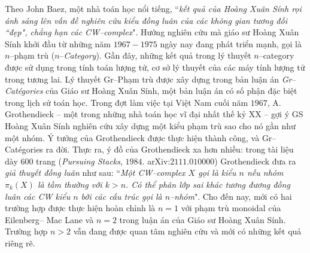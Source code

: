 \begin{multicols}{2}
	\vskip 0.1cm
	Theo John Baez, một nhà toán học nổi tiếng, ``\textit{kết quả của Hoàng Xuân Sính rọi ánh sáng lên vấn đề nghiên cứu kiểu đồng luân của các không gian tương đối ``đẹp", chẳng hạn các CW--complex}".   
	\vskip 0.1cm
	Hướng nghiên cứu mà giáo sư Hoàng Xuân Sính khởi đầu từ những năm $1967-1975$ ngày nay đang phát triển mạnh, gọi là $n$--phạm trù ($n$--\textit{Category}). Gần đây, những kết quả trong lý thuyết $n$--category được sử dụng trong tính toán lượng tử, cơ sở lý thuyết của các máy tính lượng tử trong tương lai.
	\vskip 0.1cm
	Lý thuyết Gr--Phạm trù được xây dựng trong bản luận án \textit{Gr--Catégories} của Giáo sư Hoàng Xuân Sính, một bản luận án có số phận đặc biệt trong lịch sử toán học. 
	\vskip 0.1cm
	Trong đợt làm việc tại Việt Nam cuối năm $1967$, A. Grothendieck -- một trong những nhà toán học vĩ đại nhất thế kỷ XX -- gợi ý GS Hoàng Xuân Sính nghiên cứu xây dựng một kiểu phạm trù sao cho nó gần như một nhóm. Ý tưởng của Grothendieck được thực hiện thành công, và Gr--Catégories ra đời. Thực ra, ý đồ của Grothendieck xa hơn nhiều: trong tài liệu dày $600$ trang (\textit{Pursuing Stacks}, $1984$. arXiv:$2111.010000$) Grothendieck đưa ra \textit{giả thuyết đồng luân} như sau: ``\textit{Một CW--complex $X$ gọi là kiểu $n$ nếu nhóm $\pi_k(X)$ là tầm thường với $k > n$. Có thể phân lớp sai khác tương đương đồng luân các CW kiểu $n$ bởi các cấu trúc gọi là $n$--nhóm}". Cho đến nay, mới có hai trường hợp được thực hiện hoàn chỉnh là $n =1$ với phạm trù monoidal của Eilenberg-- Mac Lane và  $n = 2$ trong luận án của Giáo sư Hoàng Xuân Sính. Trường hợp $n > 2$ vẫn đang được quan tâm nghiên cứu và mới có những kết quả riêng rẽ.
	\begin{figure}[H]
		\vspace*{-5pt}
		\centering
		\captionsetup{labelformat= empty, justification=centering}

\end{figure}
\end{multicols}
